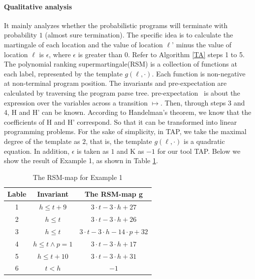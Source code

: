 \documentclass[sigconf,review, anonymous]{acmart}
\begin{document}
\paragraph{Qualitative analysis} It mainly analyzes whether the probabilistic programs will terminate with probability $1$ (almost sure termination). The specific idea is to calculate the martingale of each location and the value of location $\ell$' minus the value of location $\ell$ is $\epsilon$, where $\epsilon$ is greater than $0$. Refer to Algorithm \ref{TA} steps 1 to 5. The polynomial ranking supermartingale(RSM) is a collection of functions at each label, represented by the template $g(\ell,\cdot)$. Each function is non-negative at non-terminal program position. The invariants and pre-expectation are calculated by traversing the program parse tree. pre-expectation~\cite{Chakarov2013Martingales} is about the expression over the variables across a transition $\mapsto$. Then, through steps 3 and 4, H and H' can be known. According to Handelman's theorem, we know that the coefficients of H and H' correspond. So that it can be transformed into linear programming problems.  For the sake of simplicity, in TAP, we take the maximal degree of the template as $2$, that is, the template $g(\ell,\cdot)$ is a quadratic equation. In addition, $\epsilon$ is taken as $1$ and K as $-1$ for our tool TAP. Below we show the result of Example 1, as shown in Table \ref{RSM}. 

\begin{table}[htb]
	\centering
	\caption{The RSM-map for Example 1}
	\label{RSM}
	\begin{tabular}{|c|c|c|}
		\hline
		Lable& Invariant & The RSM-map g \\ \hline
		1 & $h\leq t+9$ &$3\cdot t-3\cdot h+27$ \\ \hline
		2 & $h\leq t$ &$3\cdot t-3\cdot h+26$ \\ \hline
		3 & $h\leq t$  &$3\cdot t-3\cdot h-14\cdot p+32$ \\ \hline
		4 & $h\leq t\land p=1$ &$3\cdot t-3\cdot h+17$ \\ \hline
		5 & $h\leq t+10$&$3\cdot t-3\cdot h+31$ \\ \hline
		6 & $t<h$ &$-1$ \\ \hline
	\end{tabular}
\end{table}
\end{document}
